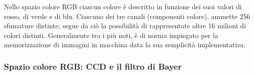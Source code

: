 \documentclass{subfiles}
\begin{document}
Nello spazio colore RGB ciascun colore è descritto in funzione dei suoi valori di rosso, di verde e di blu.
Ciascuno dei tre canali (componenti colore), ammette 256 sfumature distinte; segue da ciò la possibilità di rappresentate oltre 16 milioni di colori distinti.
Generalmente tra i più noti, è di norma impiegato per la memorizzazione di immagini in macchina data la sua semplicità implementativa.

\subsubsection{Spazio colore RGB: CCD e il filtro di Bayer}

\end{document}
